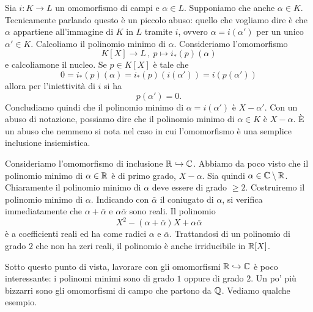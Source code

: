 \begin{esem}
Sia \(i : K \to L\) un omomorfismo di campi e \(\alpha \in L\). Supponiamo che anche \(\alpha \in K\). Tecnicamente parlando questo è un piccolo abuso: quello che vogliamo dire è che \(\alpha\) appartiene all'immagine di \(K\) in \(L\) tramite \(i\), ovvero \(\alpha = i\left(\alpha'\right)\) per un unico \(\alpha' \in K\). Calcoliamo il polinomio minimo di \(\alpha\). Consideriamo l'omomorfismo
\[K[X] \to L \,,\ p \mapsto i_\ast (p)(\alpha)\]
e calcoliamone il nucleo. Se \(p \in K[X]\) è tale che
\[0 = i_\ast(p)(\alpha) = i_\ast(p)\left(i\left(\alpha'\right)\right) = i\left(p\left(\alpha'\right)\right)\]
allora per l'iniettività di \(i\) si ha
\[p\left(\alpha'\right) = 0 .\]
Concludiamo quindi che il polinomio minimo di \(\alpha = i\left(\alpha'\right)\) è \(X-\alpha'\). Con un abuso di notazione, possiamo dire che il polinomio minimo di \(\alpha \in K\) è \(X-\alpha\). È un abuso che nemmeno si nota nel caso in cui l'omomorfismo è una semplice inclusione insiemistica.
\end{esem}

\begin{esem}
Consideriamo l'omomorfismo di inclusione \(\mathbb{R} \hookrightarrow \mathbb{C}\). Abbiamo da poco visto che il polinomio minimo di \(\alpha \in \mathbb{R}\) è di primo grado, \(X-\alpha\). Sia quindi \(\alpha \in \mathbb{C} \setminus \mathbb{R}\). Chiaramente il polinomio minimo di \(\alpha\) deve essere di grado \(\ge 2\). Costruiremo il polinomio minimo di \(\alpha\). Indicando con \(\bar\alpha\) il coniugato di \(\alpha\), si verifica immediatamente che \(\alpha + \bar\alpha\) e \(\alpha \bar\alpha\) sono reali. Il polinomio
\[X^2 - (\alpha + \bar\alpha)X + \alpha \bar\alpha\]
è a coefficienti reali ed ha come radici \(\alpha\) e \(\bar\alpha\). Trattandosi di un polinomio di grado \(2\) che non ha zeri reali, il polinomio è anche irriducibile in \(\mathbb{R}[X]\).
\end{esem}

Sotto questo punto di vista, lavorare con gli omomorfismi \(\mathbb{R} \hookrightarrow \mathbb{C}\) è poco interessante: i polinomi minimi sono di grado \(1\) oppure di grado \(2\). Un po' più bizzarri sono gli omomorfismi di campo che partono da \(\mathbb{Q}\). Vediamo qualche esempio.


